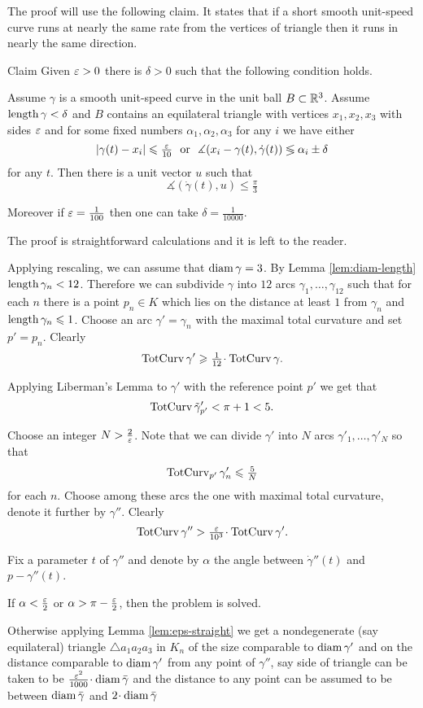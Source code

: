 \documentclass[a4paper,10pt]{amsart}
\begin{document}
The proof will use the following claim.
It states that 
if a short smooth unit-speed curve runs at nearly the same rate from the vertices of triangle then it runs in nearly the same direction.

\begin{thm}{Claim}
Given $\varepsilon>0$ there is $\delta>0$ such that the following condition holds.

Assume $\gamma$ is a smooth unit-speed curve 
in the unit ball $B\subset\mathbb{R}^3$.
Assume 
$\mathop{\rm length}\nolimits\gamma<\delta$ 
and $B$ contains an equilateral triangle with vertices $x_1,x_2,x_3$ with sides $\varepsilon$
and for some fixed numbers
$\alpha_1,\alpha_2,\alpha_3$
for any $i$
we have either
\[|\gamma(t)-x_i|\le \tfrac\eps{10}\ \ \text{or}\ \ \measuredangle(x_i-\gamma(t),\dot\gamma(t))\lege \alpha_i\pm\delta\]
for any $t$.
Then there is a unit vector $u$ such that
\[\measuredangle(\dot\gamma(t),u)\le\tfrac\pi3\]

Moreover if $\varepsilon=\tfrac1{100}$ 
then one can take $\delta=\tfrac1{10000}$.
\end{thm}

The proof is straightforward calculations
and it is left to the reader.

Applying rescaling, we can assume that $\operatorname{diam}\gamma=3$.
By Lemma \ref{lem:diam-length} $\length\gamma_n\zz<12$.
Therefore we can subdivide $\gamma$ into $12$ 
arcs $\gamma_1,\dots,\gamma_{12}$
such that for each $n$ there is a point $p_n\in K$ 
which lies on the distance at least $1$ from $\gamma_n$ and $\mathop{\rm length}\nolimits\gamma_n\leqslant 1$.
Choose
an arc $\gamma'=\gamma_n$ with the maximal total curvature 
and set $p'=p_n$.
Clearly
\[\tc\gamma'\ge\tfrac1{12}\cdot\tc\gamma.\]


Applying Liberman's Lemma to $\gamma'$ with  the reference point $p'$ 
we get that 
\[\mathop{\rm TotCurv}\nolimits\tilde\gamma'_{p'}<\pi+1<5.\]

Choose an integer $N>\tfrac2{\varepsilon}$.
Note that we can divide $\gamma'$ into $N$ arcs 
$\gamma'_1,\dots,\gamma'_N$
so that 
\[\mathop{\rm TotCurv}\nolimits_{p'}\gamma_n'\leqslant \tfrac{5}{N}\]
for each $n$.
Choose among these arcs the one with maximal total curvature,
denote it further by $\gamma''$.
Clearly 
\[\tc\gamma''>\tfrac\eps{10^3}\cdot \tc\gamma'.\]

Fix a parameter $t$ of $\gamma''$
and denote by $\alpha$ the angle between $\dot\gamma''(t)$ and $p-\gamma''(t)$.

If $\alpha<\tfrac{\varepsilon}2$ or $\alpha>\pi-\tfrac{\varepsilon}2$,
then the problem is solved.

Otherwise 
applying Lemma \ref{lem:eps-straight} we get a nondegenerate (say equilateral) 
triangle $\triangle a_1a_2a_3$ in $K_n$ 
of the size comparable to $\operatorname{diam} \gamma'$ 
and on the distance comparable to $\operatorname{diam} \gamma'$ from any point of $\gamma''$,
say side of triangle can be taken to be $\tfrac{\eps^2}{1000}\cdot\diam \bar\gamma$
and the distance to any point can be assumed to be between $\operatorname{diam} \bar\gamma$ and $2\cdot \diam \bar\gamma$
\end{document}

